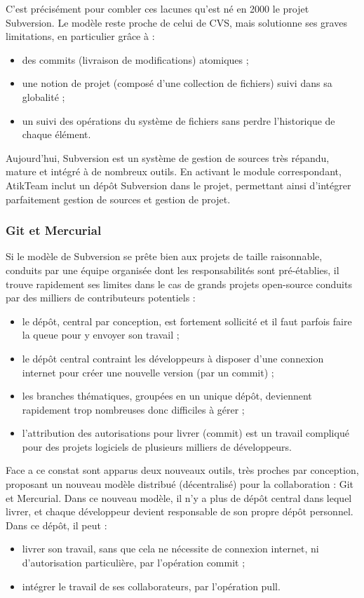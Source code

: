 C'est précisément pour combler ces lacunes qu'est né en 2000 le projet Subversion. Le modèle reste proche de celui de CVS, mais solutionne ses graves limitations, en particulier grâce à :
\begin{itemize}
\item des commits (livraison de modifications) atomiques ;
\item une notion de projet (composé d'une collection de fichiers) suivi dans sa globalité ;
\item un suivi des opérations du système de fichiers sans perdre l'historique de chaque élément.
\end{itemize}

Aujourd'hui, Subversion est un système de gestion de sources très répandu, mature et intégré à de nombreux outils. En activant le module correspondant, AtikTeam inclut un dépôt Subversion dans le projet, permettant ainsi d'intégrer parfaitement gestion de sources et gestion de projet.

\subsubsection{Git et Mercurial}
Si le modèle de Subversion se prête bien aux projets de taille raisonnable, conduits par une équipe organisée dont les responsabilités sont pré-établies, il trouve rapidement ses limites dans le cas de grands projets open-source conduits par des milliers de contributeurs potentiels :
\begin{itemize}
\item le dépôt, central par conception, est fortement sollicité et il faut parfois faire la queue pour y envoyer son travail ;
\item le dépôt central contraint les développeurs à disposer d'une connexion internet pour créer une nouvelle version (par un commit) ;
\item les branches thématiques, groupées en un unique dépôt, deviennent rapidement trop nombreuses donc difficiles à gérer ;
\item l'attribution des autorisations pour livrer (commit) est un travail compliqué pour des projets logiciels de plusieurs milliers de développeurs.
\end{itemize}

Face a ce constat sont apparus deux nouveaux outils, très proches par conception, proposant un nouveau modèle distribué (décentralisé) pour la collaboration : Git et Mercurial. Dans ce nouveau modèle, il n'y a plus de dépôt central dans lequel livrer, et chaque développeur devient responsable de son propre dépôt personnel. Dans ce dépôt, il peut :
\begin{itemize}
\item livrer son travail, sans que cela ne nécessite de connexion internet, ni d'autorisation particulière, par l'opération commit ;
\item intégrer le travail de ses collaborateurs, par l'opération pull.
\end{itemize}

